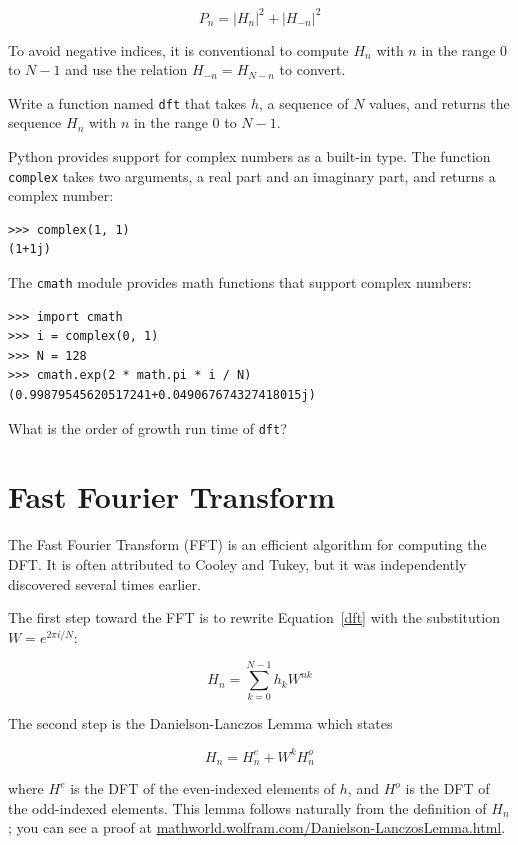 \documentclass[10pt]{book}
\begin{document}
\[ P_n = |H_n|^2 + |H_{-n}|^2 \]

To avoid negative indices, it is conventional to compute
$H_n$ with $n$ in the range $0$ to $N-1$ and use the relation
$H_{-n} = H_{N-n}$ to convert.

\begin{ex}

Write a function named {\tt dft} that takes $h$, a sequence of $N$
values, and returns the sequence $H_n$ with $n$ in the range $0$ to
$N-1$.

Python provides support for complex numbers as a built-in type.
The function {\tt complex} takes two arguments, a real part
and an imaginary part, and returns a complex number:

\begin{verbatim}
>>> complex(1, 1)
(1+1j)
\end{verbatim}

The {\tt cmath} module provides math functions that support
complex numbers:

\begin{verbatim}
>>> import cmath
>>> i = complex(0, 1)
>>> N = 128
>>> cmath.exp(2 * math.pi * i / N)
(0.99879545620517241+0.049067674327418015j)

\end{verbatim}

What is the order of growth run time of {\tt dft}?

\end{ex}


\section{Fast Fourier Transform}
 
The Fast Fourier Transform (FFT) is an efficient algorithm for
computing the DFT.  It is often attributed to Cooley and Tukey,
but it was independently discovered several times earlier.

The first step toward the FFT is to rewrite Equation~\ref{dft}
with the substitution $W = e^{2 \pi i/N}$:

\begin{equation}
H_n = \sum_{k=0}^{N-1} h_k W^{n k}
\end{equation}

The second step is the Danielson-Lanczos Lemma which states

\[ H_n = H^e_n + W^k H^o_n \]

where $H^e$ is the DFT of the even-indexed elements
of $h$, and $H^o$ is the DFT of the odd-indexed elements.
This lemma follows naturally from the definition of $H_n$; you can see
a proof at \url{mathworld.wolfram.com/Danielson-LanczosLemma.html}.
\end{document}
